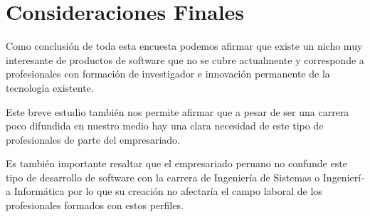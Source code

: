 \section{Consideraciones Finales}

Como conclusión de toda esta encuesta podemos afirmar que existe un nicho muy interesante de productos de software que no se cubre actualmente y corresponde a profesionales con formación de investigador e innovación permanente de la tecnologí­a existente.


Este breve estudio también nos permite afirmar que a pesar de ser una carrera poco difundida en nuestro medio hay una clara necesidad de este tipo de profesionales de parte del empresariado.


Es también importante resaltar que el empresariado peruano no confunde este tipo de desarrollo de software con la carrera de Ingenierí­a de Sistemas o Ingenierí­a Informática por lo que su creación no afectarí­a el campo laboral de los profesionales formados con estos perfiles.
